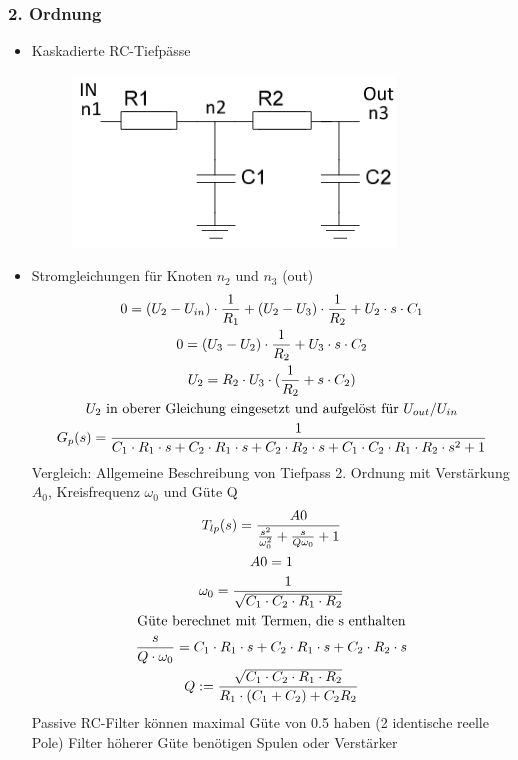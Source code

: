 \subsubsection{2. Ordnung}
\begin{itemize}
  \item Kaskadierte RC-Tiefpässe\\
  \begin{figure}[htb]
  \includegraphics[scale=0.4]{pictures/tiefpass2ordnung}
  \end{figure}
  \item Stromgleichungen für Knoten $n_2$ und $n_3$ (out)
  \begin{gather}
  0=(U_2-U_{in})\cdot \frac{1}{R_1}+(U_2-U_3)\cdot \frac{1}{R_2}+U_2\cdot s\cdot C_1\\
  0=(U_3-U_2)\cdot \frac{1}{R_2}+U_3\cdot s\cdot C_2\\
  U_2=R_2\cdot U_3\cdot (\frac{1}{R_2}+s\cdot C_2)\\
  \text{$U_2$ in oberer Gleichung eingesetzt und aufgelöst für
  $U_{out} /U_{in}$}\notag\\
  G_{p}(s)=\frac{1}{C_1\cdot R_1\cdot s+C_2\cdot R_1\cdot s+C_2\cdot R_2\cdot s+C_1\cdot C_2\cdot R_1\cdot R_2\cdot s^2+1}
  \end{gather}
  Vergleich: Allgemeine Beschreibung von Tiefpass 2. Ordnung mit
  Verstärkung $A_0$, Kreisfrequenz $\omega_{0}$ und Güte Q
  \begin{gather}
  T_{lp}(s)=\frac{A0}{\frac{s^2}{\omega_{0}^2}+\frac{s}{Q\omega_{0}}+1}\\
  A0=1\notag\\
  \omega_{0}=\frac{1}{\sqrt{C_1\cdot C_2\cdot R_1\cdot R_2}}\\
  \text{Güte berechnet mit Termen, die s enthalten}\notag\\
  \frac{s}{Q\cdot \omega_{0}}=C_1\cdot R_1\cdot s+C_2\cdot R_1\cdot s+C_2\cdot R_2\cdot s\\
  Q:=\frac{\sqrt{C_1\cdot C_2\cdot R_1\cdot R_2}}{R_1\cdot (C_1+C_2)+C_2R_2}
  \end{gather}
  Passive RC-Filter können maximal Güte von 0.5 haben (2 identische reelle
  Pole) Filter höherer Güte benötigen Spulen oder Verstärker
\end{itemize}

